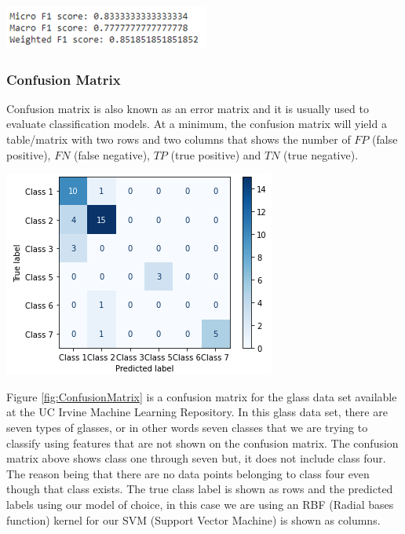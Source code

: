 \documentclass[a4paper,12pt]{report}
\begin{document}
\begin{center}
    \captionsetup{type=figure}
    \includegraphics[width=.9\linewidth]{media/F1Results.png}
    \label{fig:F1Results}
\end{center}

\subsubsection{Confusion Matrix}

Confusion matrix is also known as an error matrix and it is usually used to evaluate classification models. At a minimum, the confusion matrix will yield a table/matrix with two rows and two columns that shows the number of $FP$ (false positive), $FN$ (false negative), $TP$ (true positive) and $TN$ (true negative).

\begin{center}
    \captionsetup{type=figure}
    \includegraphics[width=.9\linewidth]{media/ConfusionMatrix.png}
    \label{fig:ConfusionMatrix}
\end{center}
 
Figure \ref{fig:ConfusionMatrix} is a confusion matrix for the glass data set available at the UC Irvine Machine Learning Repository. In this glass data set, there are seven types of glasses, or in other words seven classes that we are trying to classify using features that are not shown on the confusion matrix. The confusion matrix above shows class one through seven but, it does not include class four. The reason being that there are no data points belonging to class four even though that class exists. The true class label is shown as rows and the predicted labels using our model of choice, in this case we are using an RBF (Radial bases function) kernel for our SVM (Support Vector Machine) is shown as columns.
\end{document}
